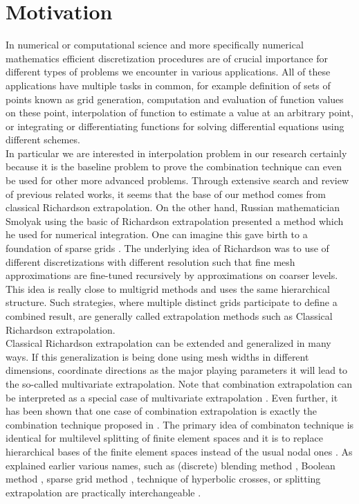\section{Motivation}
In numerical or computational science and more specifically numerical mathematics efficient discretization procedures are of crucial importance for different types of problems we encounter in various applications. All of these applications have multiple tasks in common, for example definition of sets of points known as grid generation, computation and evaluation of function values on these point, interpolation of function to estimate a value at an arbitrary point, or integrating or differentiating functions for solving differential equations using different schemes.\\
In particular we are interested in interpolation problem in our research certainly because it is the baseline problem to prove the combination technique can even be used for other more advanced problems. Through extensive search and review of previous related works, it seems that the base of our method comes from classical Richardson extrapolation\cite{Rude1994}. On the other hand, Russian mathematician Smolyak using the basic of Richardson extrapolation presented a method which he used for numerical integration. One can imagine this gave birth to a foundation of sparse grids \cite{smolyak63quadrature}.
The underlying idea of Richardson was to use of different discretizations with different resolution such that fine mesh approximations are fine-tuned recursively by approximations on coarser levels. This idea is really close to multigrid methods and uses the same hierarchical structure.  Such strategies, where multiple distinct grids participate to define a combined  result, are generally called extrapolation methods such as Classical Richardson extrapolation.\\
Classical Richardson extrapolation can be extended and generalized in many ways. If this generalization is being done using  mesh widths in different dimensions, coordinate directions as the major playing parameters it will lead to the so-called multivariate extrapolation\cite{Rude1994}. Note that combination extrapolation can be interpreted as a special case of multivariate extrapolation \cite{Griebel1992, Rude92extrapolationand}. Even further, it has been shown that one case of combination extrapolation is exactly the combination technique proposed in \cite{Griebel1992b}. The primary idea of combinaton technique is identical for multilevel splitting of finite element spaces and it is to replace hierarchical bases of the finite element spaces instead of the usual nodal ones \cite{Yserentant1986}. As explained earlier various names, such as (discrete) blending method \cite{Gordon1971}, Boolean method \cite{delvos1989boolean}, sparse grid method \cite{Zenger1990}, technique of hyperbolic crosses\cite{Temlyakov1993}, or splitting extrapolation \cite{Zumbusch2000} are practically interchangeable \cite{Griebel1998}.
